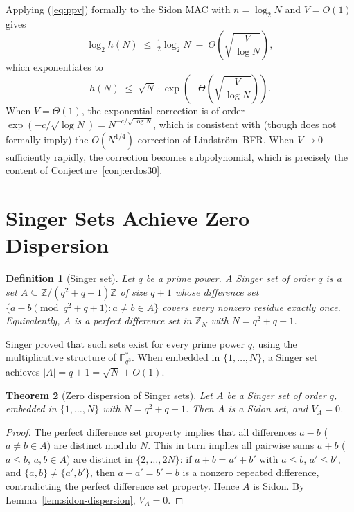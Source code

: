 \documentclass[12pt]{amsart}
\newtheorem{theorem}{Theorem}[section]
\newtheorem{definition}[theorem]{Definition}
\newcommand{\Z}{\mathbb{Z}}
\newcommand{\F}{\mathbb{F}}
\begin{document}
Applying (\ref{eq:ppv}) formally to the Sidon MAC with $n = \log_2 N$ and
$V = O(1)$ gives
\[
   \log_2 h(N) \;\le\; \tfrac{1}{2}\log_2 N \;-\; \Theta\!\left(\sqrt{\frac{V}{\log N}}\right),
\]
which exponentiates to
\begin{equation}
\label{eq:ppv-sidon}
   h(N) \;\le\; \sqrt{N} \cdot \exp\!\left(-\Theta\!\left(\sqrt{\frac{V}{\log N}}\right)\right).
\end{equation}
When $V = \Theta(1)$, the exponential correction is of order
$\exp(-c/\sqrt{\log N}) = N^{-c/\sqrt{\log N}}$, which is consistent with
(though does not formally imply) the $O(N^{1/4})$ correction of
Lindstr\"{o}m--BFR.  When $V \to 0$ sufficiently rapidly, the correction
becomes subpolynomial, which is precisely the content of
Conjecture~\ref{conj:erdos30}.

\section{Singer Sets Achieve Zero Dispersion}
\label{sec:singer}

\begin{definition}[Singer set]
Let $q$ be a prime power.  A \emph{Singer set} of order $q$ is a set $A
\subseteq \Z/(q^2+q+1)\Z$ of size $q+1$ whose difference set $\{a - b \pmod{q^2+q+1} :
a \ne b \in A\}$ covers every nonzero residue exactly once.  Equivalently, $A$
is a \emph{perfect difference set} in $\Z_N$ with $N = q^2 + q + 1$.
\end{definition}

Singer \cite{Singer38} proved that such sets exist for every prime power $q$,
using the multiplicative structure of $\F_{q^3}^*$.  When embedded in
$\{1,\ldots,N\}$, a Singer set achieves $|A| = q + 1 = \sqrt{N} + O(1)$.

\begin{theorem}[Zero dispersion of Singer sets]
\label{thm:main}
Let $A$ be a Singer set of order $q$, embedded in $\{1,\ldots,N\}$ with $N =
q^2 + q + 1$.  Then $A$ is a Sidon set, and $V_A = 0$.
\end{theorem}

\begin{proof}
The perfect difference set property implies that all differences $a - b$ ($a
\ne b \in A$) are distinct modulo $N$.  This in turn implies all pairwise sums
$a + b$ ($a \le b$, $a, b \in A$) are distinct in $\{2,\ldots,2N\}$: if
$a + b = a' + b'$ with $a \le b$, $a' \le b'$, and $\{a,b\} \ne \{a',b'\}$,
then $a - a' = b' - b$ is a nonzero repeated difference, contradicting the
perfect difference set property.  Hence $A$ is Sidon.  By
Lemma~\ref{lem:sidon-dispersion}, $V_A = 0$.
\end{proof}
\end{document}
